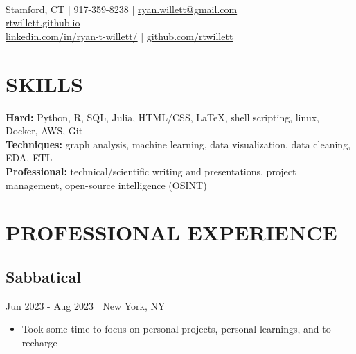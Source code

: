 \documentclass[11pt]{article}
\title{\vspace{-6cm}}
\date{}
\author{Ryan Willett}
\newenvironment{myitemize}
{ \begin{itemize}
	\setlength{\itemsep}{0pt}
	\setlength{\parskip}{0pt}
	\setlength{\parsep}{0pt}     }
{ \end{itemize}                  }
\begin{document}
\maketitle

\section*{}
  \\
\normalsize
Stamford, CT | 917-359-8238 | \href{mailto:ryan.willett@gmail.com}{ryan.willett@gmail.com} \\
\href{http://rtwillett.github.io}{rtwillett.github.io} \\
\href{https://linkedin.com/in/ryan-t-willett/}{linkedin.com/in/ryan-t-willett/} | \href{https://github.com/rtwillett}{github.com/rtwillett}

\raggedright

\section*{SKILLS}
{\bfseries Hard:} Python, R, SQL, Julia, HTML/CSS, \LaTeX, shell scripting, linux, Docker, AWS, Git \\
{\bfseries Techniques:} graph analysis, machine learning, data visualization, data cleaning, EDA, ETL \\
{\bfseries Professional:} technical/scientific writing and presentations, project management, open-source intelligence (OSINT)

\section*{PROFESSIONAL EXPERIENCE}

\subsection*{Sabbatical}
{\bfseries}Jun 2023 - Aug 2023 | New York, NY
\begin{myitemize}
	\item Took some time to focus on personal projects, personal learnings, and to recharge
\end{myitemize}
\end{document}
